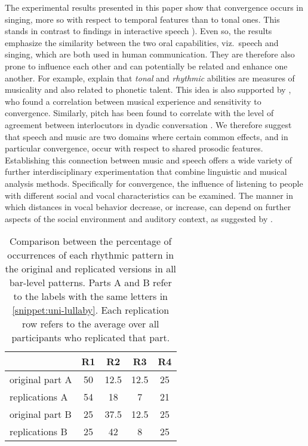The experimental results presented in this paper show that convergence occurs in singing, more so with respect to temporal features than to tonal ones.
This stands in contrast to findings in interactive speech \citep[e.g.,][]{Raveh2019InterspeechAlexa}).
Even so, the results emphasize the similarity between the two oral capabilities, viz.\ speech and singing, which are both used in human communication.
They are therefore also prone to influence each other and can potentially be related and enhance one another.
For example, \citet[][p. 216]{Nardo2009musicality} explain that \emph{tonal} and \emph{rhythmic} abilities are measures of musicality and also related to phonetic talent.
This idea is also supported by \citet{Tsang2018musical}, who found a correlation between musical experience and sensitivity to convergence.
Similarly, pitch has been found to correlate with the level of agreement between interlocutors in dyadic conversation \citep{Okada2012interpreting}.
We therefore suggest that speech and music are two domains where certain common effects, and in particular convergence, occur with respect to shared prosodic features.
Establishing this connection between music and speech offers a wide variety of further interdisciplinary experimentation that combine linguistic and musical analysis methods.
Specifically for convergence, the influence of listening to people with different social and vocal characteristics can be examined.
The manner in which distances in vocal behavior decrease, or increase, can depend on further aspects of the social environment and auditory context, as suggested by \citet{Noy1999psychoanalysis}.

\begin{table}
	\caption[Percentages of rhythmic pattern replications]
		{Comparison between the percentage of occurrences of each rhythmic pattern in the original and replicated versions in all bar-level patterns.
		Parts A and B refer to the labels with the same letters in \cref{snippet:uni-lullaby}.
		Each replication row refers to the average over all participants who replicated that part.}
	\label{tab:neutral_rhythm_key}  
	\centering
	\begin{tabularx}{\linewidth}{XSSSS}
		\toprule
						& \bfseries{R1}		& \bfseries{R2}		& \bfseries{R3}		& \bfseries{R4}\\
		\midrule
		original part A	& 50				& 12.5				& 12.5				& 25\\
		replications A	& 54				& 18				& 7					& 21\\
		\rule{0pt}{0.5cm}%
		original part B	& 25				& 37.5				& 12.5				& 25\\
		replications B	& 25				& 42				& 8					& 25\\		
		\bottomrule
	\end{tabularx}
\end{table}

